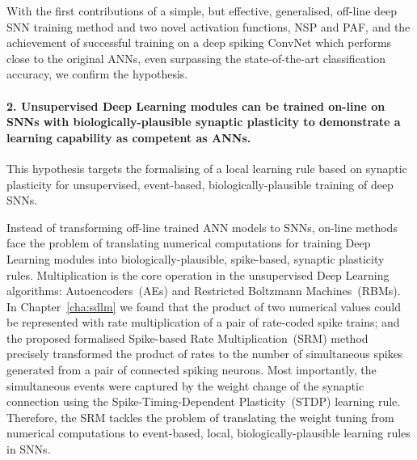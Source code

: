 With the first contributions of a simple, but effective, generalised, off-line deep SNN training method and two novel activation functions, NSP and PAF, and the achievement of successful training on a deep spiking ConvNet which performs close to the original ANNs, even surpassing the state-of-the-art classification accuracy, we confirm the hypothesis.

\paragraph{2. Unsupervised Deep Learning modules can be trained on-line on SNNs with biologically-plausible synaptic plasticity to demonstrate a learning capability as competent as ANNs.}
This hypothesis targets the formalising of a local learning rule based on synaptic plasticity for unsupervised, event-based, biologically-plausible training of deep SNNs. %


Instead of transforming off-line trained ANN models to SNNs, on-line methods face the problem of translating numerical computations for training Deep Learning modules into biologically-plausible, spike-based, synaptic plasticity rules.
Multiplication is the core operation in the unsupervised Deep Learning algorithms: Autoencoders~(AEs) and Restricted Boltzmann Machines~(RBMs).
In Chapter~\ref{cha:sdlm} we found that the product of two numerical values could be represented with rate multiplication of a pair of rate-coded spike trains;
and the proposed formalised Spike-based Rate Multiplication~(SRM) method precisely transformed the product of rates to the number of simultaneous spikes generated from a pair of connected spiking neurons.
Most importantly, the simultaneous events were captured by the weight change of the synaptic connection using the Spike-Timing-Dependent Plasticity~(STDP) learning rule.
Therefore, the SRM tackles the problem of translating the weight tuning from numerical computations to event-based, local, biologically-plausible learning rules in SNNs.

